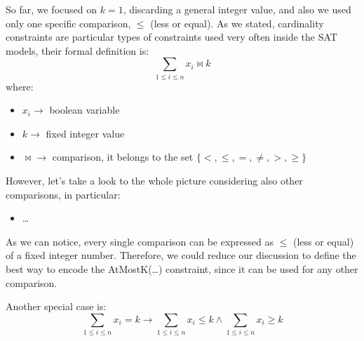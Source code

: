 So far, we focused on $k = 1$, discarding a general integer value, and also we used only one specific comparison, $\leq$ (less or equal). As we stated, cardinality constraints 
are particular types of constraints used very often inside the SAT models, their formal definition is:
$$\sum_{1 \leq i \leq n} x_i \bowtie k$$
where:
\begin{itemize}
    \renewcommand{\labelitemi}{-}
    \item $x_i \rightarrow$ boolean variable
    \item $k \rightarrow$ fixed integer value
    \item $\bowtie \rightarrow$ comparison, it belongs to the set $\{<, \leq, =, \neq, >, \geq\}$ 
\end{itemize}
However, let's take a look to the whole picture considering also other comparisons, in particular:
\begin{itemize}
    \renewcommand{\labelitemi}{-}
    \item \dots
\end{itemize}
As we can notice, every single comparison can be expressed as $\leq$ (less or equal) of a fixed integer number. Therefore, we could reduce our discussion to define 
the best way to encode the AtMostK(\dots) constraint, since it can be used for any other comparison. \vspace{7pt}

Another special case is:
$$\sum_{1 \leq i \leq n} x_i = k \rightarrow \sum_{1 \leq i \leq n} x_i \leq k \wedge \sum_{1 \leq i \leq n} x_i \geq k$$